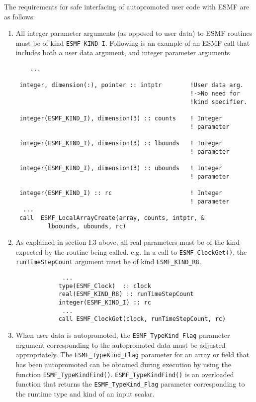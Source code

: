 The requirements for safe interfacing of autopromoted user code with ESMF are as follows:
\begin{enumerate}
\item All integer parameter arguments (as opposed to user data) to ESMF routines must be of kind {\tt ESMF\_KIND\_I}. Following is an example of an ESMF call that includes both a user data argument, and integer parameter arguments
\begin{verbatim}
    ...

 integer, dimension(:), pointer :: intptr        !User data arg.
                                                 !->No need for 
                                                 !kind specifier.

 integer(ESMF_KIND_I), dimension(3) :: counts    ! Integer 
                                                 ! parameter 

 integer(ESMF_KIND_I), dimension(3) :: lbounds   ! Integer 
                                                 ! parameter

 integer(ESMF_KIND_I), dimension(3) :: ubounds   ! Integer 
                                                 ! parameter

 integer(ESMF_KIND_I) :: rc                      ! Integer 
                                                 ! parameter
  ...
 call  ESMF_LocalArrayCreate(array, counts, intptr, &
         lboounds, ubounds, rc)
\end{verbatim}

\item As explained in section I.3 above, all real parameters must be of the kind expected by the routine being called. e.g. In a call to {\tt ESMF\_ClockGet()}, the {\tt runTimeStepCount} argument must be of kind {\tt ESMF\_KIND\_R8}.
\begin{verbatim}
             ...
            type(ESMF_Clock)  :: clock
            real(ESMF_KIND_R8) :: runTimeStepCount
            integer(ESMF_KIND_I) :: rc
             ...
            call ESMF_ClockGet(clock, runTimeStepCount, rc)
\end{verbatim}
\item When user data is autopromoted, the {\tt ESMF\_TypeKind\_Flag} parameter argument corresponding to the autopromoted data must be adjusted appropriately. The {\tt ESMF\_TypeKind\_Flag} parameter for an array or field that has been autopromoted can be obtained during execution by using the function {\tt ESMF\_TypeKindFind()}. {\tt ESMF\_TypeKindFind()} is an overloaded function that returns the {\tt ESMF\_TypeKind\_Flag} parameter corresponding to the runtime type and kind of an input scalar.


\end{enumerate}
